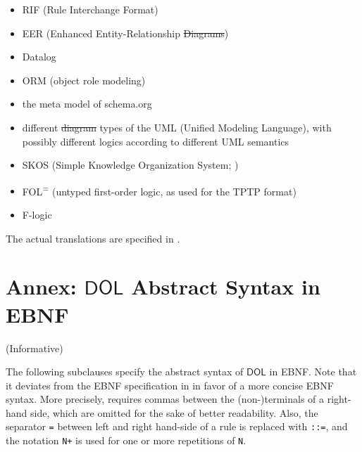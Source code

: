 \documentclass[10pt,fleqn,final]{scrreprt}
\makeatletter
\newcommand*\CommentAuthor{}
\renewcommand*\CommentAuthor{#1}}
\newcommand*\CommentDate{}
\renewcommand*\CommentDate{#1}}
\newcommand*\CommentId{}
\renewcommand*\CommentId{#1}}
\newcommand*\CommentType{}
\renewcommand*\CommentType{#1}}
\newcommand*{\SetCommentColorByType}[1]{%
\edef\localType{{#1}}%
\expandafter\ifstrequal\localType{q-aut}{\colorlet{CommentColor}{red}}{%
\expandafter\ifstrequal\localType{q-all}{\colorlet{CommentColor}{orange}}{%
\expandafter\ifstrequal\localType{todo}{\colorlet{CommentColor}{orange}}{%
\expandafter\ifstrequal\localType{fyi}{\colorlet{CommentColor}{lightgray}}{%
\colorlet{CommentColor}{yellow}}}}}}
\newcommand*{\SetCommentPrefixByType}[1]{%
\edef\localType{{#1}}%
\expandafter\@ifmtarg\localType{%
\edef\CommentPrefix{}%
}{%
\caseupper[q]{#1}%
\edef\CommentPrefix{\thestring: }%
}}
\newcommand*{\initComment}[1]{%
\setkeys{Comment}{#1}%
\SetCommentColorByType{\CommentType}%
\relax%
\SetCommentPrefixByType{\CommentType}%
\relax%
}
\newcommand*{\todonote}[2][]{%
\initComment{#1}%
\pdfcomment[author=\CommentAuthor,color=CommentColor,date=\CommentDate,id=\CommentId]{%
\CommentPrefix
#2}}
\renewcommand*{\todonote}[2][]{%
\initComment{#1}%
\ednote{\CommentPrefix #2}}
\newcommand*{\syntax}[1]{\texttt{#1}}
\newcommand*{\IS}{OMG Specification\xspace}
\newcommand*{\DOL}{\ensuremath{\mathsf{DOL}}\xspace}
\newcommand{\noterefname}{note}
\newcommand{\nref}[1]{\noterefname~\ref{#1}}
\newcommand{\informative}[0]{{\begin{center}{\Large{(Informative})}\end{center}} \bigskip}
\renewcommand{\nref}[1]{\ref{nref-#1}} %
\newcommand{\infannex}[1]{ \chapter{Annex: #1}  \informative }
\newenvironment{definitions}[0]{\medskip }{}
\providecommand{\DIFadd}[1]{{\protect\color{blue}\uwave{#1}}} %
\providecommand{\DIFdel}[1]{{\protect\color{red}\sout{#1}}}                      %
\providecommand{\DIFaddbegin}{} %
\providecommand{\DIFaddend}{} %
\providecommand{\DIFdelbegin}{} %
\providecommand{\DIFdelend}{} %
\makeatother
\begin{document}
\begin{definitions}
\begin{itemize}
\item RIF \DIFaddbegin \DIFadd{\nref{RIF} }\DIFaddend (Rule Interchange Format)
\item EER (Enhanced Entity-Relationship \DIFdelbegin \DIFdel{Diagrams}\DIFdelend \DIFaddbegin \DIFadd{Models}\DIFaddend ) %
\item Datalog
\item ORM (object role modeling)
\item the meta model of schema.org
\item different \DIFdelbegin \DIFdel{diagram }\DIFdelend \DIFaddbegin \DIFadd{model }\DIFaddend types of the UML (Unified Modeling Language), with possibly different logics according to different
UML semantics
\item SKOS (Simple Knowledge Organization System; \DIFdelbegin %
\DIFdelend \DIFaddbegin \DIFadd{\nref{SKOS}}\DIFaddend )
\item FOL\textsuperscript{=} (untyped first-order logic, as used for the
TPTP format)
\item F-logic
\end{itemize}

The actual translations are specified in \cite{OntoGraph}.






\infannex{\DOL Abstract Syntax in EBNF}
\label{a:EBNF}


The following subclauses specify the abstract syntax of \DOL in EBNF. Note that it deviates from the EBNF specification in
 \DIFdelbegin %
\DIFdelend \DIFaddbegin \DIFadd{\nref{EBNF} }\DIFaddend in favor of a more concise
EBNF syntax. More precisely, \DIFdelbegin %
\DIFdelend \DIFaddbegin \DIFadd{\nref{EBNF} }\DIFaddend requires commas between the (non-)terminals of a right-hand side, which are omitted 
for the sake of better readability. Also, the separator \syntax{=}
between left and right hand-side of a rule is replaced with \syntax{::=}, and 
 the notation \syntax{N+} is used 
for one or more repetitions of \syntax{N}.


\end{definitions}
\end{document}
